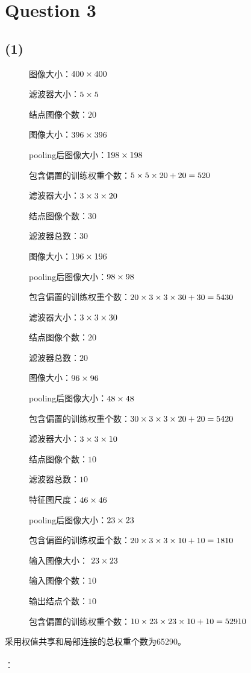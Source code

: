 \documentclass{article}
\newcommand{\question}[1]{\section*{Question #1}}
\renewcommand{\part}[1]{\subsection*{(#1)}}
\begin{document}
\question{3}
\part{1}

\begin{description}
	\item [] 图像大小：${\rm{400}} \times {\rm{400}}$
	\item [] 
	
	滤波器大小：${\rm{5}} \times {\rm{5}}$

	结点图像个数：$20$

	图像大小：${\rm{396}} \times {\rm{396}}$
	
	pooling后图像大小：${\rm{198}} \times {\rm{198}}$
	
	包含偏置的训练权重个数：${\rm{5}} \times {\rm{5}} \times {\rm{20 + 20 = 520}}$

	\item [] 
	滤波器大小：${\rm{3}} \times {\rm{3}} \times {\rm{20}}$

	结点图像个数：$30$

	滤波器总数：$30$

	图像大小：${\rm{196}} \times {\rm{196}}$
	
	pooling后图像大小：${\rm{98}} \times {\rm{98}}$
	
	包含偏置的训练权重个数：${\rm{20}} \times {\rm{3}} \times {\rm{3}} \times {\rm{30 + 30 = 5430}}$
	
	\item[]	
	滤波器大小：${\rm{3}} \times {\rm{3}} \times {\rm{30}}$

	结点图像个数：$20$

	滤波器总数：$20$
	
	图像大小：${\rm{96}} \times {\rm{96}}$
	
	pooling后图像大小：${\rm{48}} \times {\rm{48}}$
	
	包含偏置的训练权重个数：${\rm{30}} \times {\rm{3}} \times {\rm{3}} \times {\rm{20 + 20 = 5420}}$
	
	\item[]
	滤波器大小：${\rm{3}} \times {\rm{3}} \times {\rm{10}}$

	结点图像个数：$10$

	滤波器总数：$10$

	特征图尺度：${\rm{46}} \times {\rm{46}}$
	
	pooling后图像大小：${\rm{23}} \times {\rm{23}}$
	
	包含偏置的训练权重个数：${\rm{20}} \times {\rm{3}} \times {\rm{3}} \times {\rm{10 + 10 = 1810}}$

	\item[]
	输入图像大小： ${\rm{23}} \times {\rm{23}}$

	输入图像个数：$10$

	输出结点个数：$10$
	
	包含偏置的训练权重个数：${\rm{10}} \times {\rm{23}} \times {\rm{23}} \times {\rm{10 + 10 = 52910}}$
\end{description}
采用权值共享和局部连接的总权重个数为65290。
\\\\
：
\end{document}
